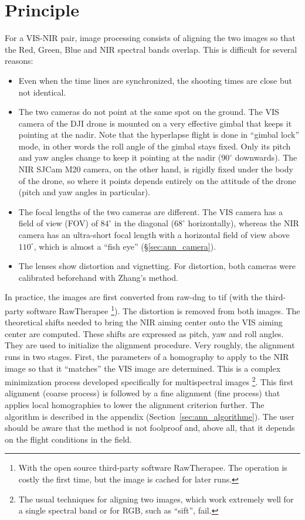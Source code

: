 \documentclass[a4paper,11pt]{report}
\begin{document}
\section{Principle}
For a VIS-NIR pair, image processing consists of aligning the two images so that the Red, Green, Blue and NIR spectral bands overlap. This is difficult for several reasons:
\begin{itemize}
	\item Even when the time lines are synchronized, the shooting times are close but not identical.
	\item The two cameras do not point at the same spot on the ground. The VIS camera of the DJI drone is mounted on a very effective gimbal that keeps it pointing at the nadir. Note that the hyperlapse flight is done in ``gimbal lock'' mode, in other words the roll angle of the gimbal stays fixed. Only its pitch and yaw angles change to keep it pointing at the nadir ($90^{\circ}$ downwards). The NIR SJCam M20 camera, on the other hand, is rigidly fixed under the body of the drone, so where it points depends entirely on the attitude of the drone (pitch and yaw angles in particular).
	\item The focal lengths of the two cameras are different. The VIS camera has a field of view (FOV) of $84^{\circ}$ in the diagonal ($68^{\circ}$ horizontally), whereas the NIR camera has an ultra-short focal length with a horizontal field of view above $110^{\circ}$, which is almost a ``fish eye'' (\S\ref{sec:ann_camera}).
	\item The lenses show distortion and vignetting. For distortion, both cameras were calibrated beforehand with Zhang's method.
\end{itemize}



In practice, the images are first converted from raw-dng to tif (with the third-party software RawTherapee
\footnote{With the open source third-party software RawTherapee. The operation is costly the first time, but the image is cached for later runs.}).  The distortion is removed from both images. The theoretical shifts needed to bring the NIR aiming center onto the VIS aiming center are computed. These shifts are expressed as pitch, yaw and roll angles. They are used to initialize the alignment procedure. Very roughly, the alignment runs in two stages. First, the parameters of a homography to apply to the NIR image so that it ``matches'' the VIS image are determined. This is a complex minimization process developed specifically for multispectral images
	\footnote{The usual techniques for aligning two images, which work extremely well for a single spectral band or for RGB, such as ``sift'', fail.}.
This first alignment (coarse process) is followed by a fine alignment (fine process) that applies local homographies to lower the alignment criterion further. The algorithm is described in the appendix (Section~\ref{sec:ann_algorithme}). The user should be aware that the method is not foolproof and, above all, that it depends on the flight conditions in the field.
\end{document}
